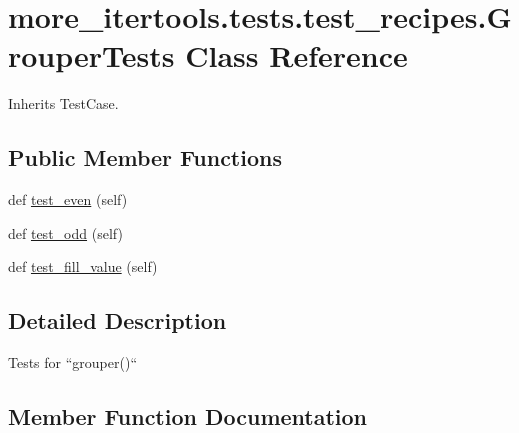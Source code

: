\hypertarget{classmore__itertools_1_1tests_1_1test__recipes_1_1_grouper_tests}{}\section{more\+\_\+itertools.\+tests.\+test\+\_\+recipes.\+Grouper\+Tests Class Reference}
\label{classmore__itertools_1_1tests_1_1test__recipes_1_1_grouper_tests}


Inherits Test\+Case.

\subsection*{Public Member Functions}
\begin{DoxyCompactItemize}
\item 
def \hyperlink{classmore__itertools_1_1tests_1_1test__recipes_1_1_grouper_tests_a33410355dfce6dbae2264350ce192124}{test\+\_\+even} (self)
\item 
def \hyperlink{classmore__itertools_1_1tests_1_1test__recipes_1_1_grouper_tests_ac2ee55ce6ee7839e9a364c4ff64c6ac6}{test\+\_\+odd} (self)
\item 
def \hyperlink{classmore__itertools_1_1tests_1_1test__recipes_1_1_grouper_tests_a3d4d7cd0be7d72ded27f86c67e6538eb}{test\+\_\+fill\+\_\+value} (self)
\end{DoxyCompactItemize}


\subsection{Detailed Description}
\begin{DoxyVerb}Tests for ``grouper()``\end{DoxyVerb}
 

\subsection{Member Function Documentation}
\mbox{\label{classmore__itertools_1_1tests_1_1test__recipes_1_1_grouper_tests_a33410355dfce6dbae2264350ce192124}} 
